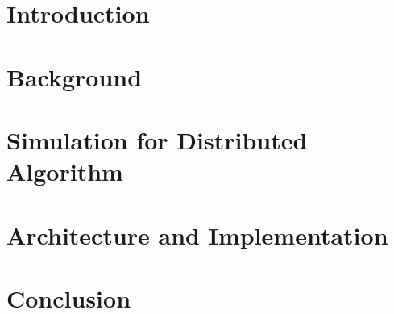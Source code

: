\documentclass[pdftex,12pt]{report}
\begin{document}
%

\tableofcontents
\listoffigures
{}
\listoftables
{}


\chapter{Introduction}



\chapter{Background}



\chapter{Simulation for Distributed Algorithm}



\chapter{Architecture and Implementation}



\chapter{Conclusion}





\end{document}
